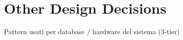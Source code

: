 \documentclass[../../../../dd.tex]{subfiles}
\begin{document}
	\section{Other Design Decisions}
		Pattern usati per database / hardware del sistema (3-tier)
	
\end{document}
